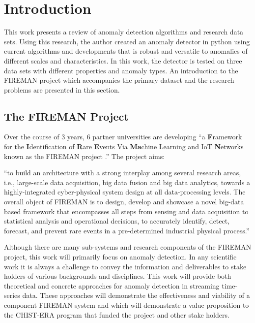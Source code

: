 \section{Introduction}
\label{ref_intro}

This work presents a review of anomaly detection algorithms and research data sets. Using this research, the author created an anomaly detector in python using current algorithms and developments that is robust and versatile to anomalies of different scales and characteristics. In this work, the detector is tested on three data sets with different properties and anomaly types. An introduction to the FIREMAN project which accompanies the primary dataset and the research problems are presented in this section.

\subsection{The FIREMAN Project}

Over the course of 3 years, 6 partner universities are developing \enquote{a \textbf{F}ramework for the \textbf{I}dentification of \textbf{R}are \textbf{E}vents Via \textbf{Ma}chine Learning and IoT \textbf{N}etworks known as the FIREMAN project \parencite{fireman-homepage}.} The project aims:
\begin{displayquote}
\enquote{to build an architecture with a strong interplay among several research areas, i.e., large-scale data acquisition, big data fusion and big data analytics, towards a highly-integrated cyber-physical system design at all data-processing levels. The overall object of FIREMAN is to design, develop and showcase a novel big-data based framework that encompasses all steps from sensing and data acquisition to statistical analysis and operational decisions, to accurately identify, detect, forecast, and prevent rare events in a pre-determined industrial physical process.} 
\end{displayquote} 

Although there are many sub-systems and research components of the FIREMAN project, this work will primarily focus on anomaly detection. In any scientific work it is always a challenge to convey the information and deliverables to stake holders of various backgrounds and disciplines. This work will provide both theoretical and concrete approaches for anomaly detection in streaming time-series data. These approaches will demonstrate the effectiveness and viability of a component FIREMAN system and which will demonstrate a value proposition to the CHIST-ERA program that funded the project and other stake holders. 

